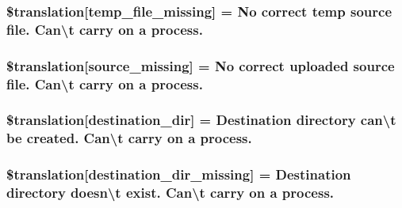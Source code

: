 \subsubsection[{\$translation}]{\setlength{\rightskip}{0pt plus 5cm}\$translation\mbox{[}\textquotesingle{}temp\+\_\+file\+\_\+missing\textquotesingle{}\mbox{]} = \textquotesingle{}No correct temp source file. Can\textbackslash{}\textquotesingle{}t carry on a process.\textquotesingle{}}\label{class_8upload_8xx___x_x_8php_ab0fa87a88aba2624004581eed0633325}
\hypertarget{class_8upload_8xx___x_x_8php_aceaaf7355acaaf10f0ae60378d03c468}{}
\subsubsection[{\$translation}]{\setlength{\rightskip}{0pt plus 5cm}\$translation\mbox{[}\textquotesingle{}source\+\_\+missing\textquotesingle{}\mbox{]} = \textquotesingle{}No correct uploaded source file. Can\textbackslash{}\textquotesingle{}t carry on a process.\textquotesingle{}}\label{class_8upload_8xx___x_x_8php_aceaaf7355acaaf10f0ae60378d03c468}
\hypertarget{class_8upload_8xx___x_x_8php_aff2427c72a2598aefa6d58df1dd18b08}{}
\subsubsection[{\$translation}]{\setlength{\rightskip}{0pt plus 5cm}\$translation\mbox{[}\textquotesingle{}destination\+\_\+dir\textquotesingle{}\mbox{]} = \textquotesingle{}Destination directory can\textbackslash{}\textquotesingle{}t be created. Can\textbackslash{}\textquotesingle{}t carry on a process.\textquotesingle{}}\label{class_8upload_8xx___x_x_8php_aff2427c72a2598aefa6d58df1dd18b08}
\hypertarget{class_8upload_8xx___x_x_8php_a9ef28d3cf09942c6c0a1e77fa09185e8}{}
\subsubsection[{\$translation}]{\setlength{\rightskip}{0pt plus 5cm}\$translation\mbox{[}\textquotesingle{}destination\+\_\+dir\+\_\+missing\textquotesingle{}\mbox{]} = \textquotesingle{}Destination directory doesn\textbackslash{}\textquotesingle{}t exist. Can\textbackslash{}\textquotesingle{}t carry on a process.\textquotesingle{}}\label{class_8upload_8xx___x_x_8php_a9ef28d3cf09942c6c0a1e77fa09185e8}
\hypertarget{class_8upload_8xx___x_x_8php_a5704a67137126e8c87b7a364175929d4}{}
